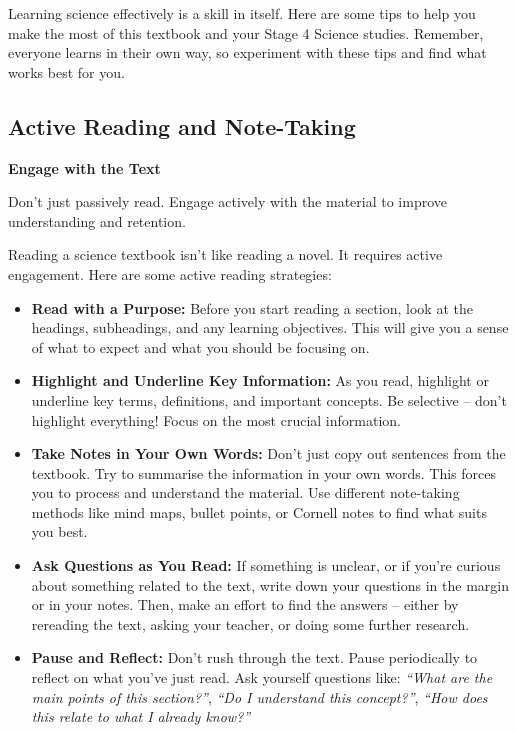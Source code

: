 Learning science effectively is a skill in itself.  Here are some tips to help you make the most of this textbook and your Stage 4 Science studies.  Remember, everyone learns in their own way, so experiment with these tips and find what works best for you.

\subsection{Active Reading and Note-Taking}

\begin{marginnote}
\textbf{Engage with the Text}

Don't just passively read. Engage actively with the material to improve understanding and retention.
\end{marginnote}
Reading a science textbook isn't like reading a novel.  It requires active engagement.  Here are some active reading strategies:

\begin{itemize}
    \item \textbf{Read with a Purpose:} Before you start reading a section, look at the headings, subheadings, and any learning objectives.  This will give you a sense of what to expect and what you should be focusing on.
    \item \textbf{Highlight and Underline Key Information:} As you read, highlight or underline key terms, definitions, and important concepts.  Be selective – don’t highlight everything! Focus on the most crucial information.
    \item \textbf{Take Notes in Your Own Words:}  Don’t just copy out sentences from the textbook.  Try to summarise the information in your own words.  This forces you to process and understand the material.  Use different note-taking methods like mind maps, bullet points, or Cornell notes to find what suits you best.
    \item \textbf{Ask Questions as You Read:}  If something is unclear, or if you're curious about something related to the text, write down your questions in the margin or in your notes.  Then, make an effort to find the answers – either by rereading the text, asking your teacher, or doing some further research.
    \item \textbf{Pause and Reflect:}  Don’t rush through the text.  Pause periodically to reflect on what you’ve just read.  Ask yourself questions like: \textit{“What are the main points of this section?”}, \textit{“Do I understand this concept?”}, \textit{“How does this relate to what I already know?”}
\end{itemize}

